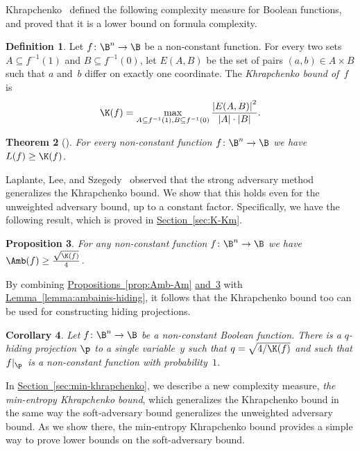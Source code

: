 \documentclass[11pt]{article}
\numberwithin{equation}{section}
\newtheorem{theorem}{Theorem}[section]
\newtheorem{proposition}[theorem]{Proposition}
\newtheorem{corollary}[theorem]{Corollary}
\theoremstyle{definition}
\newtheorem{definition}[theorem]{Definition}
\theoremstyle{plain}
\newcommand{\expref}[2]{\hyperref[#2]{#1~\ref{#2}}}
\theoremstyle{definition}\newtheorem{notation}[theorem]{Notation}\theoremstyle{plain}
\begin{document}
Khrapchenko~\cite{K72} defined the following complexity measure
for Boolean functions, and proved that it is a lower bound on formula
complexity. 
\begin{definition}
\label{def:khrapchenko}Let $f\colon\B^{n}\to\B$ be a non-constant function.
For every two sets $A\subseteq f^{-1}(1)$ and $B\subseteq f^{-1}(0)$,
let $E(A,B)$ be the set of pairs $(a,b)\in A\times B$ such that
$a$ and~$b$ differ on exactly one coordinate. The \emph{Khrapchenko
bound of~$f$} is 
\[
\K(f)=\max_{A\subseteq f^{-1}(1),B\subseteq f^{-1}(0)}\frac{\left|E(A,B)\right|^{2}}{\left|A\right|\cdot\left|B\right|}.
\]
\end{definition}

\begin{theorem}[\cite{K72}]
\label{thm:khrapchenko-formula-size}For every non-constant function
$f\colon\B^{n}\to\B$ we have $L(f)\ge\K(f)$.
\end{theorem}

Laplante, Lee, and Szegedy~\cite{LLS06} observed that the strong
adversary method generalizes the Khrapchenko bound. We show that this
holds even for the unweighted adversary bound, up to a constant factor.
Specifically, we have the following result, which is proved in \expref{Section}{sec:K-Km}.
\begin{proposition}
\label{prop:K-Amb}For any non-constant function $f\colon\B^{n}\to\B$
we have $\Amb(f)\geq\frac{\sqrt{\K(f)}}{4}$.
\end{proposition}

By combining \expref{Propositions}{prop:Amb-Am} \expref{and}{prop:K-Amb}
with \expref{Lemma}{lemma:ambainis-hiding}, it follows
that the Khrapchenko bound too can be used for constructing hiding
projections.
\begin{corollary}
\label{cor:khrapchenko-hiding}Let $f\colon\B^{n}\to\B$ be a non-constant
Boolean function. There is a $q$-hiding projection $\p$ to a single
variable~$y$ such that $q=\sqrt{4/\K(f)}$ and such that $f|_{\p}$~is
a non-constant function with probability~$1$.
\end{corollary}

In \expref{Section}{sec:min-khrapchenko}, we describe a new complexity measure,
\emph{the min-entropy Khrapchenko bound}, which generalizes the Khrapchenko
bound in the same way the soft-adversary bound generalizes the unweighted
adversary bound. As we show there, the min-entropy Khrapchenko bound
provides a simple way to prove lower bounds on the soft-adversary
bound.
\end{document}
